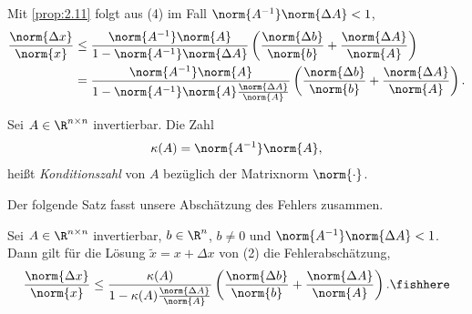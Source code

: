 Mit \ref{prop:2.11} folgt aus (4) im Fall $\norm{A^{-1}}\norm{\Delta A} < 1$,
\begin{align*}
\frac{\norm{\Delta x}}{\norm{x}}
&\le \frac{\norm{A^{-1}}\norm{A}}{1-\norm{A^{-1}}\norm{\Delta A}}
\left(\frac{\norm{\Delta b}}{\norm{b}} + \frac{\norm{\Delta
A}}{\norm{A}}\right)\\
&= \frac{\norm{A^{-1}}\norm{A}}{1-\norm{A^{-1}}\norm{A}\frac{\norm{\Delta
A}}{\norm{A}}}\left(\frac{\norm{\Delta b}}{\norm{b}} + \frac{\norm{\Delta
A}}{\norm{A}}\right).
\end{align*}

\begin{defn}
\label{defn:2.12}
Sei $A\in\R^{n\times n}$ invertierbar. Die Zahl
\begin{align*}
\kappa(A) = \norm{A^{-1}}\norm{A},
\end{align*}
heißt \emph{Konditionszahl} von $A$ bezüglich der Matrixnorm
$\norm{\cdot}$.\fishhere
\end{defn}
Der folgende Satz fasst unsere Abschätzung des Fehlers zusammen. 
\begin{prop}
\label{prop:2.13}
Sei $A\in\R^{n\times n}$ invertierbar, $b\in\R^n$, $b\neq 0$ und
$\norm{A^{-1}}\norm{\Delta A} <1$. Dann gilt für die Lösung $\tilde{x} = x +
\Delta x$ von (2) die Fehlerabschätzung,
\begin{align*}
\frac{\norm{\Delta x}}{\norm{x}}
\le
\frac{\kappa(A)}{1-\kappa(A)\frac{\norm{\Delta
A}}{\norm{A}}}\left(\frac{\norm{\Delta b}}{\norm{b}} + \frac{\norm{\Delta
A}}{\norm{A}}\right).\fishhere
\end{align*}
\end{prop}

